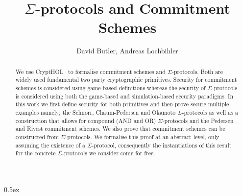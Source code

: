 \documentclass[11pt,a4paper]{article}
\begin{document}
\title{$\Sigma$-protocols and Commitment Schemes}
\author{David Butler, Andreas Lochbihler}
\maketitle

\begin{abstract}
	We use CryptHOL~\cite{Basin2017} to formalise commitment schemes and $\Sigma$-protocols. Both are widely used fundamental two party cryptographic primitives. Security for commitment schemes is considered using game-based definitions whereas the security of $\Sigma$-protocols is considered using both the game-based and simulation-based security paradigms. In this work we first define security for both primitives and then prove secure multiple examples namely; the Schnorr, Chaum-Pedersen and Okamoto $\Sigma$-protocols as well as a construction that allows for compound (AND and OR) $\Sigma$-protocols  and the Pedersen and Rivest commitment schemes. We also prove that commitment schemes can be constructed from $\Sigma$-protocols. We formalise this proof at an abstract level, only assuming the existence of a $\Sigma$-protocol, consequently the instantiations of this result for the concrete $\Sigma$-protocols we consider come for free.
	
\end{abstract}

\tableofcontents

\parindent 0pt\parskip 0.5ex





\end{document}
